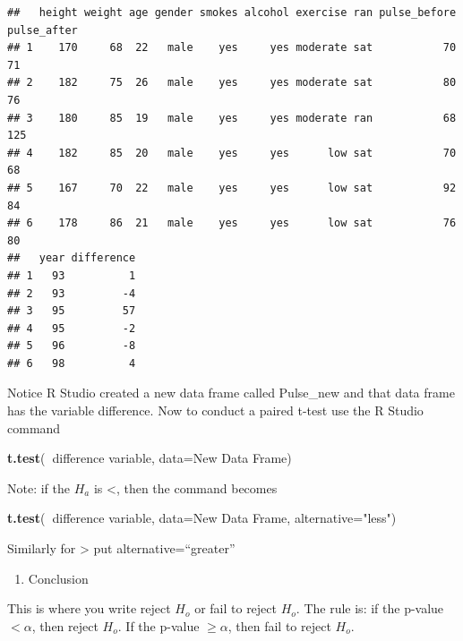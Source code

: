 \documentclass[
]{book}
\newenvironment{Shaded}{\begin{snugshade}}{\end{snugshade}}
\newcommand{\DataTypeTok}[1]{\textcolor[rgb]{0.13,0.29,0.53}{#1}}
\newcommand{\KeywordTok}[1]{\textcolor[rgb]{0.13,0.29,0.53}{\textbf{#1}}}
\newcommand{\NormalTok}[1]{#1}
\newcommand{\OperatorTok}[1]{\textcolor[rgb]{0.81,0.36,0.00}{\textbf{#1}}}
\newcommand{\StringTok}[1]{\textcolor[rgb]{0.31,0.60,0.02}{#1}}
\providecommand{\tightlist}{%
  \setlength{\itemsep}{0pt}\setlength{\parskip}{0pt}}
\begin{document}
\begin{verbatim}
##   height weight age gender smokes alcohol exercise ran pulse_before pulse_after
## 1    170     68  22   male    yes     yes moderate sat           70          71
## 2    182     75  26   male    yes     yes moderate sat           80          76
## 3    180     85  19   male    yes     yes moderate ran           68         125
## 4    182     85  20   male    yes     yes      low sat           70          68
## 5    167     70  22   male    yes     yes      low sat           92          84
## 6    178     86  21   male    yes     yes      low sat           76          80
##   year difference
## 1   93          1
## 2   93         -4
## 3   95         57
## 4   95         -2
## 5   96         -8
## 6   98          4
\end{verbatim}

Notice R Studio created a new data frame called Pulse\_new and that data frame has the variable difference.
Now to conduct a paired t-test use the R Studio command

\begin{Shaded}
\begin{Highlighting}[]
\KeywordTok{t.test}\NormalTok{(}\OperatorTok{~}\NormalTok{difference variable, }\DataTypeTok{data=}\NormalTok{New Data Frame)}
\end{Highlighting}
\end{Shaded}

Note: if the \(H_a\) is \textless, then the command becomes

\begin{Shaded}
\begin{Highlighting}[]
\KeywordTok{t.test}\NormalTok{(}\OperatorTok{~}\NormalTok{difference variable, }\DataTypeTok{data=}\NormalTok{New Data Frame, }\DataTypeTok{alternative=}\StringTok{"less"}\NormalTok{)}
\end{Highlighting}
\end{Shaded}

Similarly for \textgreater{} put alternative=``greater''

\begin{enumerate}
\def\labelenumi{\arabic{enumi}.}
\setcounter{enumi}{4}
\tightlist
\item
  Conclusion
\end{enumerate}

This is where you write reject \(H_o\) or fail to reject \(H_o\). The rule is: if the p-value \(<\alpha\), then reject \(H_o\). If the p-value \(\ge\alpha\), then fail to reject \(H_o\).
\end{document}
